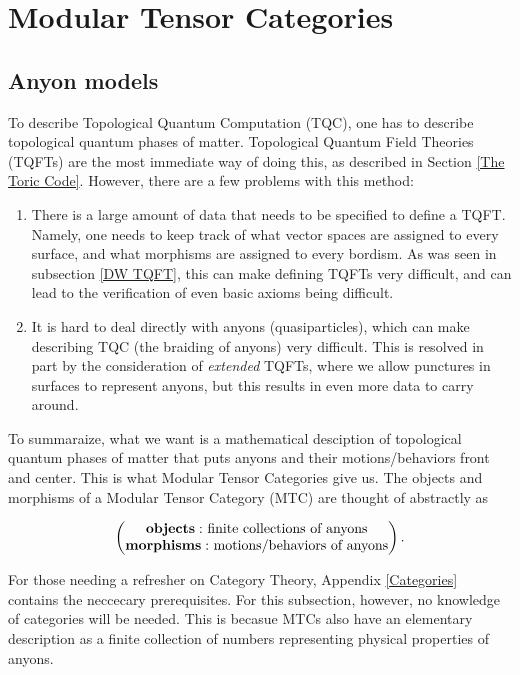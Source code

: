 \documentclass{article}
\theoremstyle{definition}
\numberwithin{figure}{section}
\begin{document}
\section{Modular Tensor Categories}
\label{Modular Tensor Categories}

\subsection{Anyon models}
\label{Anyon model}

To describe Topological Quantum Computation (TQC), one has to describe topological quantum phases of matter. Topological Quantum Field Theories (TQFTs) are the most immediate way of doing this, as described in Section \ref{The Toric Code}. However, there are a few problems with this method:

\begin{enumerate}
\item There is a large amount of data that needs to be specified to define a TQFT. Namely, one needs to keep track of what vector spaces are assigned to every surface, and what morphisms are assigned to every bordism. As was seen in subsection \ref{DW TQFT}, this can make defining TQFTs very difficult, and can lead to the verification of even basic axioms being difficult.
\item It is hard to deal directly with anyons (quasiparticles), which can make describing TQC (the braiding of anyons) very difficult. This is resolved in part by the consideration of \textit{extended} TQFTs, where we allow punctures in surfaces to represent anyons, but this results in even more data to carry around.
\end{enumerate}

To summaraize, what we want is a mathematical desciption of topological quantum phases of matter that puts anyons and their motions/behaviors front and center. This is what Modular Tensor Categories give us. The objects and morphisms of a Modular Tensor Category (MTC) are thought of abstractly as

$$
\begin{pmatrix}
\bold{objects:}\text{ finite collections of anyons} \\
\bold{morphisms:}\text{ motions/behaviors of anyons}
\end{pmatrix}.
$$

For those needing a refresher on Category Theory, Appendix \ref{Categories} contains the neccecary prerequisites. For this subsection, however, no knowledge of categories will be needed. This is becasue MTCs also have an elementary description as a finite collection of numbers representing physical properties of anyons.
\end{document}
